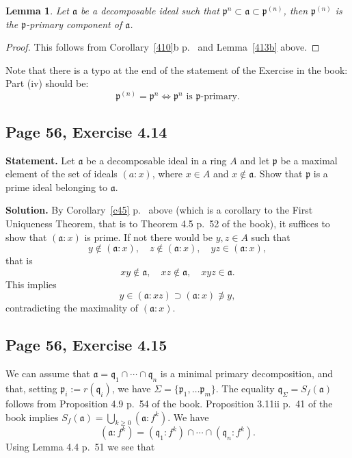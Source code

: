 \documentclass[parskip=half,fontsize=12pt]{scrartcl}%
\newcommand{\mf}{\mathfrak}
\newcommand{\aaa}{\mf a}
\newcommand{\ppp}{\mf p}
\newcommand{\qqq}{\mf q}
\newtheorem{lem}[thm]{Lemma}
\begin{document}
\begin{lem}
Let $\aaa$ be a decomposable ideal such that $\ppp^n\subset\aaa\subset\ppp^{(n)}$, then $\ppp^{(n)}$ is the $\ppp$-primary component of $\aaa$. 
\end{lem}
\begin{proof}
This follows from Corollary~\ref{410}b p.~\pageref{410} and Lemma~\ref{413b} above.
\end{proof}

Note that there is a typo at the end of the statement of the Exercise in the book: Part (iv) should be: 
$$
\ppp^{(n)}=\ppp^n\iff\ppp^n\text{ is }\ppp\text{-primary.}
$$ 

\subsection{Page 56, Exercise 4.14}%

\textbf{Statement.} Let $\aaa$ be a decomposable ideal in a ring $A$ and let $\ppp$ be a maximal element of the set of ideals $(a:x)$, where $x\in A$ and $x\notin\aaa$. Show that $\ppp$ is a prime ideal belonging to $\aaa$.

\textbf{Solution.} By Corollary~\ref{c45} p.~\pageref{c45} above (which is a corollary to the First Uniqueness Theorem, that is to Theorem 4.5 p.~52 of the book), it suffices to show that $(\aaa:x)$ is prime. If not there would be $y,z\in A$ such that 
$$
y\notin(\aaa:x),\quad z\notin(\aaa:x),\quad yz\in(\aaa:x),
$$ 
that is 
$$
xy\notin\aaa,\quad xz\notin\aaa,\quad xyz\in\aaa.
$$ 
This implies 
$$
y\in(\aaa:xz)\supset(\aaa:x)\not\ni y,
$$ 
contradicting the maximality of $(\aaa:x)$.%

\subsection{Page 56, Exercise 4.15}%

We can assume that $\aaa=\qqq_1\cap\cdots\cap\qqq_n$ is a minimal primary decomposition, and that, setting $\ppp_i:=r(\qqq_i)$, we have $\Sigma=\{\ppp_1,\dots\ppp_m\}$. The equality $\qqq_\Sigma=S_f(\aaa)$ follows from Proposition 4.9 p.~54 of the book. Proposition 3.11ii p.~41 of the book implies $S_f(\aaa)=\bigcup_{k\ge0}(\aaa:f^k)$. We have 
\begin{equation}\label{afk}
(\aaa:f^k)=(\qqq_1:f^k)\cap\cdots\cap(\qqq_n:f^k).
\end{equation} 
Using Lemma 4.4 p.~51 we see that  
\end{document}
